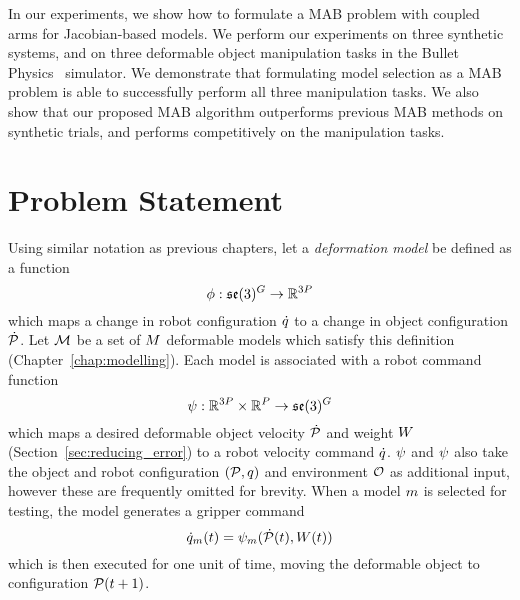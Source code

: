 In our experiments, we show how to formulate a MAB problem with coupled arms for Jacobian-based models. We perform our experiments on three synthetic systems, and on three deformable object manipulation tasks in the Bullet Physics~\cite{Coumans2010} simulator. We demonstrate that formulating model selection as a MAB problem is able to successfully perform all three manipulation tasks. We also show that our proposed MAB algorithm outperforms previous MAB methods on synthetic trials, and performs competitively on the manipulation tasks.


\section{Problem Statement}

Using similar notation as previous chapters, let a \textit{deformation model} be defined as a function 
\begin{equation}
    \phi : \mathfrak{se}(3)^G \rightarrow \mathbb{R}^{3P}
\end{equation}
which maps a change in robot configuration $\dot{q}$ to a change in object configuration $\dot{\mathcal{P}}$. Let $\mathcal{M}$ be a set of $M$ deformable models which satisfy this definition (Chapter~\ref{chap:modelling}). Each model is associated with a robot command function
\begin{equation}
    \psi : \mathbb{R}^{3P} \times \mathbb{R}^P \rightarrow \mathfrak{se}(3)^G
\end{equation}
which maps a desired deformable object velocity $\dot{\mathcal{P}}$ and weight $W$ (Section~\ref{sec:reducing_error}) to a robot velocity command $\dot{q}$. $\psi$ and $\psi$ also take the object and robot configuration $(\mathcal{P}, q)$ and environment $\mathcal{O}$ as additional input, however these are frequently omitted for brevity. When a model $m$ is selected for testing, the model generates a gripper command
\begin{equation}
    \dot{q}_{m}(t) = \psi_m(\dot{\mathcal{P}}(t), W(t))
    \label{eqn:grippervel}
\end{equation}
which is then executed for one unit of time, moving the deformable object to configuration $\mathcal{P}(t+1)$.

